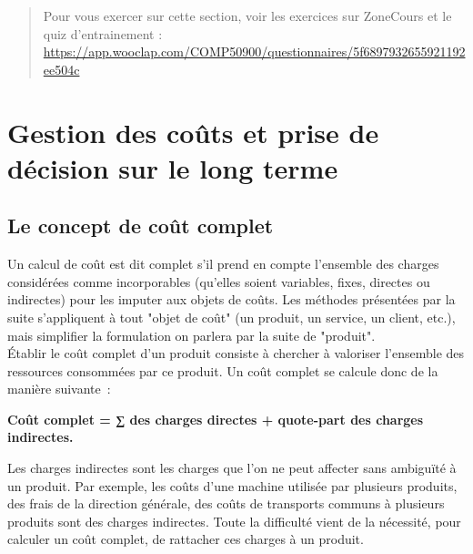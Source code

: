 \documentclass{kaobook}
\begin{document}
\begin{quote}
Pour vous exercer sur cette section, voir les exercices sur ZoneCours et le quiz d'entrainement : \url{https://app.wooclap.com/COMP50900/questionnaires/5f6897932655921192ee504c}\\
\end{quote}

\section{Gestion des coûts et prise de décision sur le long terme}
\label{sec:orgfd2564e}
\subsection{Le concept de coût complet}
\label{sec:orgacd85c2}

Un calcul de coût est dit complet s'il prend en compte l'ensemble des charges considérées comme incorporables (qu'elles soient variables, fixes, directes ou indirectes) pour les imputer aux objets de coûts. Les méthodes présentées par la suite s'appliquent à tout "objet de coût" (un produit, un service, un client, etc.), mais simplifier la formulation on parlera par la suite de "produit".\\
Établir le coût complet d'un produit consiste à chercher à valoriser l'ensemble des ressources consommées par ce produit. Un coût complet se calcule donc de la manière suivante :\\
\begin{center}
\textbf{Coût complet = ∑ des charges directes + quote-part des charges indirectes.}\\
\end{center}
Les charges indirectes sont les charges que l'on ne peut affecter sans ambiguïté à un produit. Par exemple, les coûts d'une machine utilisée par plusieurs produits, des frais de la direction générale, des coûts de transports communs à plusieurs produits sont des charges indirectes. Toute la difficulté vient de la nécessité, pour calculer un coût complet, de rattacher ces charges à un produit.\\
\end{document}
